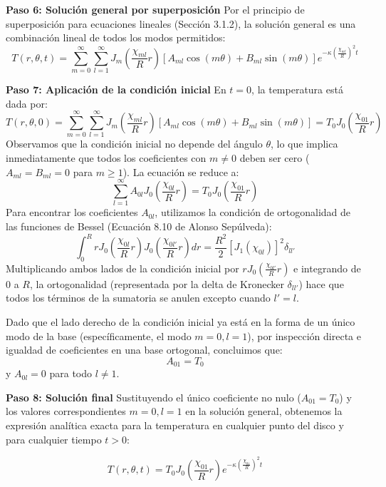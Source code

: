 \documentclass[a4paper]{article}
\begin{document}
\textbf{Paso 6: Solución general por superposición}
Por el principio de superposición para ecuaciones lineales (Sección 3.1.2), la solución general es una combinación lineal de todos los modos permitidos:
$$
T(r,\theta,t) = \sum_{m=0}^{\infty} \sum_{l=1}^{\infty} J_m\left(\frac{\chi_{ml}}{R}r\right) \left[ A_{ml} \cos(m\theta) + B_{ml} \sin(m\theta) \right] e^{-\kappa \left(\frac{\chi_{ml}}{R}\right)^2 t}
$$

\textbf{Paso 7: Aplicación de la condición inicial}
En $t=0$, la temperatura está dada por:
$$
T(r,\theta,0) = \sum_{m=0}^{\infty} \sum_{l=1}^{\infty} J_m\left(\frac{\chi_{ml}}{R}r\right) \left[ A_{ml} \cos(m\theta) + B_{ml} \sin(m\theta) \right] = T_0 J_0\left(\frac{\chi_{01}}{R}r\right)
$$
Observamos que la condición inicial no depende del ángulo $\theta$, lo que implica inmediatamente que todos los coeficientes con $m \neq 0$ deben ser cero ($A_{ml} = B_{ml} = 0$ para $m \ge 1$). La ecuación se reduce a:
$$
\sum_{l=1}^{\infty} A_{0l} J_0\left(\frac{\chi_{0l}}{R}r\right) = T_0 J_0\left(\frac{\chi_{01}}{R}r\right)
$$
Para encontrar los coeficientes $A_{0l}$, utilizamos la condición de ortogonalidad de las funciones de Bessel (Ecuación 8.10 de Alonso Sepúlveda):
$$
\int_0^R r J_0\left(\frac{\chi_{0l}}{R}r\right) J_0\left(\frac{\chi_{0l'}}{R}r\right) dr = \frac{R^2}{2} [J_1(\chi_{0l})]^2 \delta_{ll'}
$$
Multiplicando ambos lados de la condición inicial por $r J_0\left(\frac{\chi_{0l'}}{R}r\right)$ e integrando de $0$ a $R$, la ortogonalidad (representada por la delta de Kronecker $\delta_{ll'}$) hace que todos los términos de la sumatoria se anulen excepto cuando $l' = l$. 

Dado que el lado derecho de la condición inicial ya está en la forma de un único modo de la base (específicamente, el modo $m=0, l=1$), por inspección directa e igualdad de coeficientes en una base ortogonal, concluimos que:
$$
A_{01} = T_0
$$
y $A_{0l} = 0$ para todo $l \neq 1$.

\textbf{Paso 8: Solución final}
Sustituyendo el único coeficiente no nulo ($A_{01} = T_0$) y los valores correspondientes $m=0, l=1$ en la solución general, obtenemos la expresión analítica exacta para la temperatura en cualquier punto del disco y para cualquier tiempo $t > 0$:

$$
T(r,\theta,t) = T_0 J_0\left(\frac{\chi_{01}}{R}r\right) e^{-\kappa \left(\frac{\chi_{01}}{R}\right)^2 t}
$$
\end{document}
